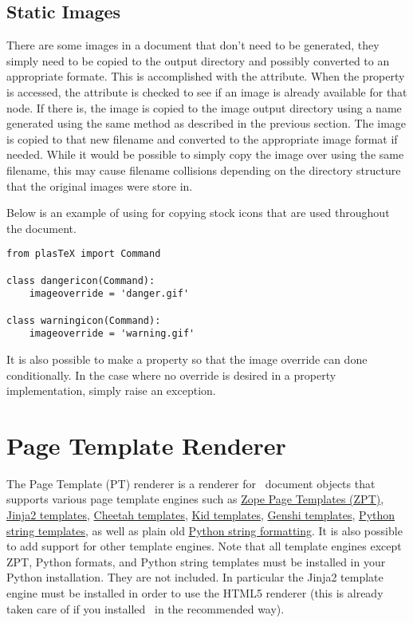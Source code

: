 \subsection{Static Images}

There are some images in a document that don't need to be generated, they
simply need to be copied to the output directory and possibly converted
to an appropriate formate.  This is accomplished with the
 attribute.  When the  property
is accessed, the  attribute is checked to see if
an image is already available for that node.  If there is, the image
is copied to the image output directory using a name generated
using the same method as described in the previous section.  The image
is copied to that new filename and converted to the appropriate
image format if needed.  While it would be possible to simply copy the
image over using the same filename, this may cause filename collisions
depending on the directory structure that the original images were
store in.

Below is an example of using  for copying
stock icons that are used throughout the document.
\begin{verbatim}
from plasTeX import Command

class dangericon(Command):
    imageoverride = 'danger.gif'

class warningicon(Command):
    imageoverride = 'warning.gif'
\end{verbatim}

It is also possible to make  a property
so that the image override can done conditionally.  In the case
where no override is desired in a property implementation, simply
raise an  exception.

\section{Page Template Renderer\label{sec:pt}}

The Page Template (PT) renderer is a renderer for \plasTeX\ document
objects that supports various page template engines such as
\href{http://www.zope.org/Documentation/Books/ZopeBook/2_6Edition/ZPT.stx}{Zope
Page Templates (ZPT)}, \href{http://jinja.pocoo.org/}{Jinja2 templates},
\href{http://www.cheetahtemplate.org/}{Cheetah templates},
\href{http://kid-templating.org/}{Kid templates},
\href{http://genshi.edgewall.org/}{Genshi templates},
\href{http://docs.python.org/lib/node40.html}{Python string templates},
as well as plain old \href{http://docs.python.org/lib/typesseq-strings.html}{Python string formatting}.
It is also possible to add support for other template engines. 
Note that all template engines except ZPT, Python formats,
and Python string templates must be installed in your Python installation.
They are not included. In particular the Jinja2 template engine must be
installed in order to use the HTML5 renderer (this is already taken care of
if you installed \plasTeX\ in the recommended way).

